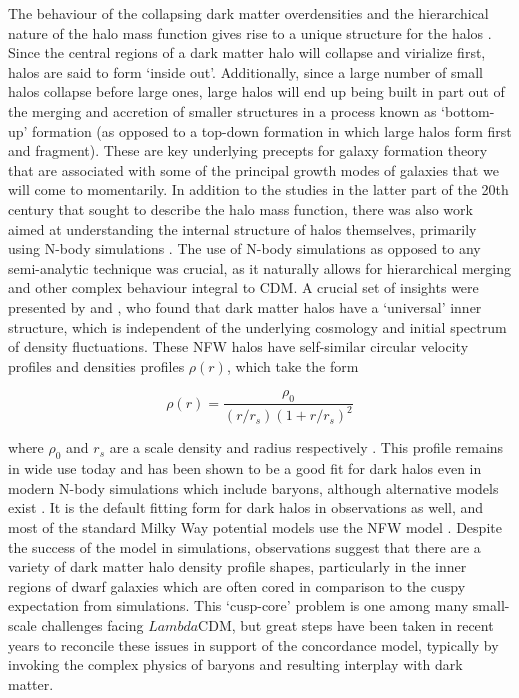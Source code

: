 The behaviour of the collapsing dark matter overdensities and the hierarchical nature of the halo mass function gives rise to a unique structure for the halos \parencite[e.g.][]{frenk85,frenk88}. Since the central regions of a dark matter halo will collapse and virialize first, halos are said to form `inside out'. Additionally, since a large number of small halos collapse before large ones, large halos will end up being built in part out of the merging and accretion of smaller structures in a process known as `bottom-up' formation (as opposed to a top-down formation in which large halos form first and fragment). These are key underlying precepts for galaxy formation theory that are associated with some of the principal growth modes of galaxies that we will come to momentarily. In addition to the studies in the latter part of the 20th century that sought to describe the halo mass function, there was also work aimed at understanding the internal structure of halos themselves, primarily using N-body simulations \parencite[e.g.][]{efstathiou88,dubinski91}. The use of N-body simulations as opposed to any semi-analytic technique was crucial, as it naturally allows for hierarchical merging and other complex behaviour integral to CDM. A crucial set of insights were presented by \textcite{navarro96} and \textcite{navarro97}, who found that dark matter halos have a `universal' inner structure, which is independent of the underlying cosmology and initial spectrum of density fluctuations. These NFW halos have self-similar circular velocity profiles and densities profiles $\rho(r)$, which take the form

\begin{equation}
    \label{ch1:eq:nfw}
    \rho(r) = \frac{\rho_{0}}{(r/r_{s})(1 + r/r_{s})^{2}}
\end{equation}

\noindent where $\rho_{0}$ and $r_{s}$ are a scale density and radius respectively \parencite[note this is a special case of the density profile of ][with {$[\alpha,\beta]=[1,3]$}]{dehnen93}. This profile remains in wide use today and has been shown to be a good fit for dark halos even in modern N-body simulations which include baryons, although alternative models exist \parencite[e.g.][]{einasto65}. It is the default fitting form for dark halos in observations as well, and most of the standard Milky Way potential models use the NFW model \parencite[e.g.][]{bovy15,mcmillan17}. Despite the success of the model in simulations, observations suggest that there are a variety of dark matter halo density profile shapes, particularly in the inner regions of dwarf galaxies which are often cored in comparison to the cuspy expectation from simulations. This `cusp-core' problem \parencite[see][for a summary]{bullock17} is one among many small-scale challenges facing $Lambda$CDM, but great steps have been taken in recent years to reconcile these issues in support of the concordance model, typically by invoking the complex physics of baryons and resulting interplay with dark matter.

